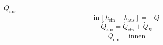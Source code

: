 \( \dot{Q}_{\text{aus}} \)  
\[ \text{in} \, [h_{\text{ein}} - h_{\text{aus}}] = -\dot{Q} \]  
\[ \dot{Q}_{\text{aus}} = \dot{Q}_{\text{ein}} + \dot{Q}_{R} \]  
\[ \dot{Q}_{\text{ein}} = \text{innen} \]